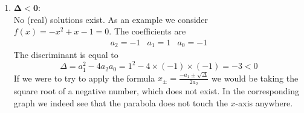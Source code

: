 \begin{enumerate}
In $f(x)=-\frac{1}{2}x^2 -3 x - \frac{9}{2} = 0$ the $a_i$'s are
\begin{eqnarray*}
a_2 = -\frac{1}{2} & a_1 = -3 & a_0 = -\frac{9}{2}
\end{eqnarray*}
The discriminant is equal to
$$
\Delta = a_1^2 - 4 a_2 a_0 = (-3)^2 - 4\times (-\frac{1}{2}) \times (-\frac{9}{2}) = 9 - 9 = 0
$$
The solution is
\begin{equation*}
x = \frac{-a_1 }{2 a_2} = \frac{-(-3)}{2 \times (-\frac{1}{2})} = -3 
\end{equation*}
\begin{center}
\end{center}

\item $\mathbf{\Delta < 0:}$\\
\noindent No (real) solutions exist. As an example we consider $f(x)= -x^2 + x-1=0$. The coefficients are
\begin{eqnarray*}
a_2 = -1 & a_1 = 1 & a_0 = -1
\end{eqnarray*}
The discriminant is equal to
$$
\Delta = a_1^2 - 4 a_2 a_0 = 1^2 - 4\times (-1) \times (-1) = -3 < 0
$$
If we were to try to apply the formula $x_{\pm} = \frac{-a_1 \pm \sqrt{\Delta}}{2a_2}$ we would be taking the square root of a negative number, which does not exist. In the corresponding graph we indeed see that the parabola does not touch the $x$-axis anywhere.
\begin{center}
\end{center}

\end{enumerate}

